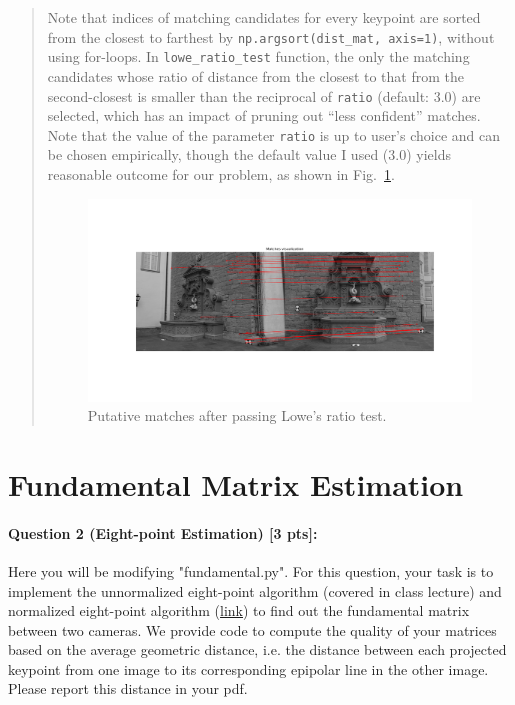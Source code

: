 \documentclass[11pt]{article}
\begin{document}
\begin{quote}
Note that indices of matching candidates for every keypoint are sorted from the closest to farthest by \texttt{np.argsort(dist\_mat, axis=1)}, without using for-loops. In \texttt{lowe\_ratio\_test} function, the only the matching candidates whose ratio of distance from the closest to that from the second-closest is smaller than the reciprocal of \texttt{ratio} (default: 3.0) are selected, which has an impact of pruning out ``less confident'' matches. Note that the value of the parameter \texttt{ratio} is up to user's choice and can be chosen empirically, though the default value I used (3.0) yields reasonable outcome for our problem, as shown in Fig.~\ref{fig:putative_matches}.

\begin{figure}[h]
    \centering
    \includegraphics[width=1.0\linewidth]{putative_matches.png}
    \caption{Putative matches after passing Lowe's ratio test.}
    \label{fig:putative_matches}
\end{figure}


\end{quote}

\section*{Fundamental Matrix Estimation} 

\paragraph{Question 2 (Eight-point Estimation) [3 pts]:} Here you will be modifying "fundamental.py". For this question, your task is to implement the unnormalized eight-point algorithm (covered in class lecture) and normalized eight-point algorithm (\href{https://en.wikipedia.org/wiki/Eight-point_algorithm#Normalized_algorithm}{link}) to find out the fundamental matrix between two cameras. We provide code to compute the quality of your matrices based on the average geometric distance, i.e. the distance between each projected keypoint from one image to its corresponding epipolar line in the other image. Please report this distance in your pdf.
\end{document}
